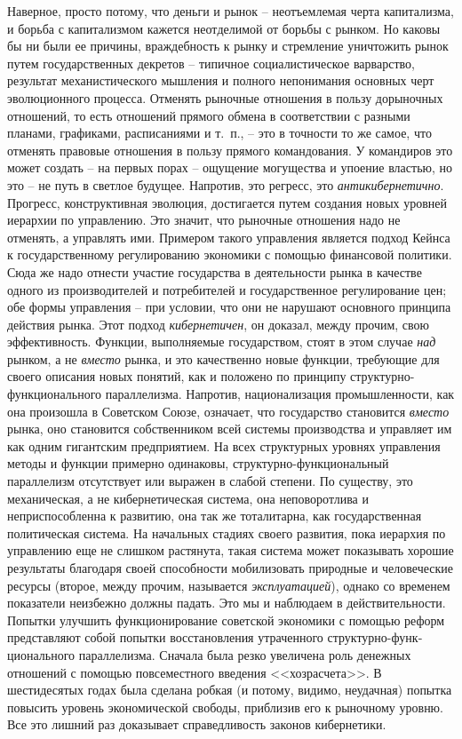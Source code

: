 \documentclass{book}
\begin{document}
Наверное, просто потому, что деньги и рынок -- неотъемле­мая черта капитализма, и 
борьба с капитализмом кажется неот­делимой от борьбы с рынком. Но каковы бы ни были ее 
причи­ны, враждебность к рынку и стремление уничтожить рынок путем государственных 
декретов -- типичное социалистическое варварство, результат механистического мышления 
и полного непонимания основных черт эволюционного процесса. Отменять рыночные 
отношения в пользу дорыночных отношений, то есть отношений прямого обмена в 
соответствии с разными планами, графиками, расписаниями и т.~п., -- это в точности то 
же самое, что отменять правовые отношения в пользу прямого командо­вания. У командиров 
это может создать -- на первых порах -- ощущение могущества и упоение властью, но это 
-- не путь в светлое будущее. Напротив, это регресс, это \textit{антикибернетично}. 
Прогресс, конструктивная эволюция, достигается путем со­здания новых уровней иерархии 
по управлению. Это значит, что рыночные отношения надо не отменять, а управлять ими. 
Примером такого управления является подход Кейнса к госу­дарственному регулированию 
экономики с помощью финансо­вой политики. Сюда же надо отнести участие государства в 
дея­тельности рынка в качестве одного из производителей и потре­бителей и 
государственное регулирование цен; обе формы уп­равления -- при условии, что они не 
нарушают основного прин­ципа действия рынка. Этот подход \textit{кибернетичен},  он 
доказал, между прочим, свою эффективность. Функции, выполняемые государством, стоят в 
этом случае \textit{над}  рынком, а не \textit{вместо} рынка, и это качественно новые 
функции, требующие для своего описания новых понятий, как и положено по принципу 
струк­турно-функционального параллелизма. Напротив, национализа­ция промышленности, как 
она произошла в Советском Союзе, означает, что государство становится \textit{вместо}  
рынка, оно стано­вится собственником всей системы производства и управляет им как 
одним гигантским предприятием. На всех структурных уровнях управления методы и 
функции примерно одинаковы, структурно-функциональный параллелизм отсутствует или 
выра­жен в слабой степени. По существу, это механическая, а не ки­бернетическая 
система, она неповоротлива и неприспособленна к развитию, она так же тоталитарна, как 
государственная поли­тическая система. На начальных стадиях своего развития, пока 
иерархия по управлению еще не слишком растянута, такая си­стема может показывать 
хорошие результаты благодаря своей способности мобилизовать природные и человеческие 
ресурсы (второе, между прочим, называется \textit{эксплуатацией}),  однако со 
временем показатели неизбежно должны падать. Это мы и на­блюдаем в действительности. 
Попытки улучшить функциони­рование советской экономики с помощью реформ представляют 
собой попытки восстановления утраченного структурно-функ­ционального параллелизма. 
Сначала была резко увеличена роль денежных отношений с помощью повсеместного введения 
<<хозрасчета>>. В шестидесятых годах была сделана робкая (и потому, видимо, 
неудачная) попытка повысить уровень экономической свободы, приблизив его к рыночному 
уровню. Все это лишний раз доказывает 
справедливость законов кибернетики.
\end{document}
